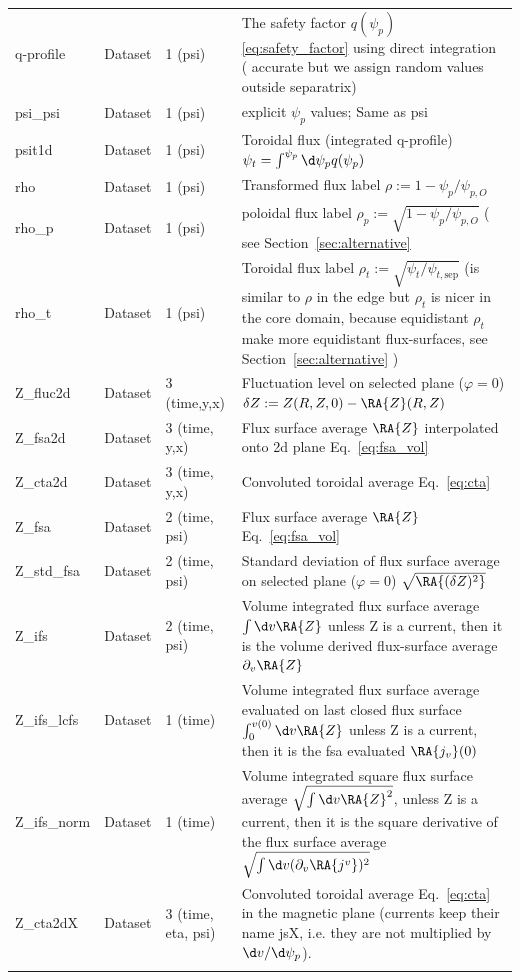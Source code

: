 \begin{longtable}{lll>{\RaggedRight}p{7cm}}
q-profile        & Dataset & 1 (psi) & The safety factor $q(\psi_p)$ \eqref{eq:safety_factor} using direct integration ( accurate but we assign random values outside separatrix) \\
psi\_psi         & Dataset & 1 (psi) & explicit $\psi_p$ values; Same as psi \\
psit1d           & Dataset & 1 (psi) & Toroidal flux (integrated q-profile) $\psi_t = \int^{\psi_p} \d\psi_p q(\psi_p)$ \\
rho              & Dataset & 1 (psi) & Transformed flux label $\rho:= 1 - \psi_p/\psi_{p,O}$ \\
rho\_p           & Dataset & 1 (psi) & poloidal flux label $\rho_p:= \sqrt{1 - \psi_p/\psi_{p,O}}$  ( see Section~\ref{sec:alternative}\\
    rho\_t           & Dataset & 1 (psi) & Toroidal flux label $\rho_t :=
    \sqrt{\psi_t/\psi_{t,\mathrm{sep}}}$ (is similar to $\rho$ in the edge but
    $\rho_t$ is nicer in the core domain, because equidistant $\rho_t$ make
more equidistant flux-surfaces, see Section~\ref{sec:alternative} )\\
Z\_fluc2d        & Dataset & 3 (time,y,x) & Fluctuation level on selected plane ($\varphi= 0$) $\delta Z := Z(R,Z,0) - \RA{ Z}(R,Z)$ \\
Z\_fsa2d         & Dataset & 3 (time, y,x) & Flux surface average $\RA{ Z}$ interpolated onto 2d plane Eq.~\eqref{eq:fsa_vol} \\
Z\_cta2d         & Dataset & 3 (time, y,x) & Convoluted toroidal average Eq.~\eqref{eq:cta} \\
Z\_fsa           & Dataset & 2 (time, psi) & Flux surface average $\RA{ Z}$ Eq.~\eqref{eq:fsa_vol} \\
Z\_std\_fsa      & Dataset & 2 (time, psi) & Standard deviation of flux surface average on selected plane ($\varphi=0$) $\sqrt{\RA{(\delta Z)^2}}$ \\
Z\_ifs           & Dataset & 2 (time, psi) & Volume integrated flux surface average $\int\d v\RA{ Z}$ unless Z is a current, then it is the volume derived flux-surface average $\partial_v \RA{ Z}$ \\
Z\_ifs\_lcfs     & Dataset & 1 (time) & Volume integrated flux surface average evaluated on last closed flux surface $\int_0^{v(0)}\d v\RA{ Z}$ unless Z is a current, then it is the fsa evaluated $\RA{ j_v}(0)$ \\
Z\_ifs\_norm     & Dataset & 1 (time) & Volume integrated square flux surface average $\sqrt{\int \d v \RA{Z}^2}$, unless Z is a current, then it is the square derivative of the flux surface average $\sqrt{\int\d v (\partial_v \RA{j^v})^2}$\\
Z\_cta2dX  & Dataset & 3 (time, eta, psi) & Convoluted toroidal average Eq.~\eqref{eq:cta} in the magnetic plane (currents keep their name jsX, i.e. they are not multiplied by $\d v/\d\psi_p$). \\
\bottomrule
\label{table:diag}
\end{longtable}
